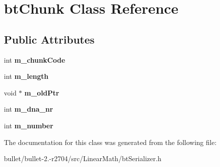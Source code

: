 \hypertarget{classbt_chunk}{\section{bt\+Chunk Class Reference}
\label{classbt_chunk}
}
\subsection*{Public Attributes}
\begin{DoxyCompactItemize}
\item 
\hypertarget{classbt_chunk_a9d6db015694b37fad18bf7e4c0bc95fb}{int {\bfseries m\+\_\+chunk\+Code}}\label{classbt_chunk_a9d6db015694b37fad18bf7e4c0bc95fb}

\item 
\hypertarget{classbt_chunk_a8d09379c186e19d599a3a9bbe2a71c67}{int {\bfseries m\+\_\+length}}\label{classbt_chunk_a8d09379c186e19d599a3a9bbe2a71c67}

\item 
\hypertarget{classbt_chunk_aa9c3adc50e121d98bbb7e8c91c472fa5}{void $\ast$ {\bfseries m\+\_\+old\+Ptr}}\label{classbt_chunk_aa9c3adc50e121d98bbb7e8c91c472fa5}

\item 
\hypertarget{classbt_chunk_abcbb7c1bc0db7f13c4073707dba451bb}{int {\bfseries m\+\_\+dna\+\_\+nr}}\label{classbt_chunk_abcbb7c1bc0db7f13c4073707dba451bb}

\item 
\hypertarget{classbt_chunk_a32e09b132faa88daeab92d290720cc12}{int {\bfseries m\+\_\+number}}\label{classbt_chunk_a32e09b132faa88daeab92d290720cc12}

\end{DoxyCompactItemize}


The documentation for this class was generated from the following file\+:\begin{DoxyCompactItemize}
\item 
bullet/bullet-\/2.-\/r2704/src/\+Linear\+Math/bt\+Serializer.\+h\end{DoxyCompactItemize}
